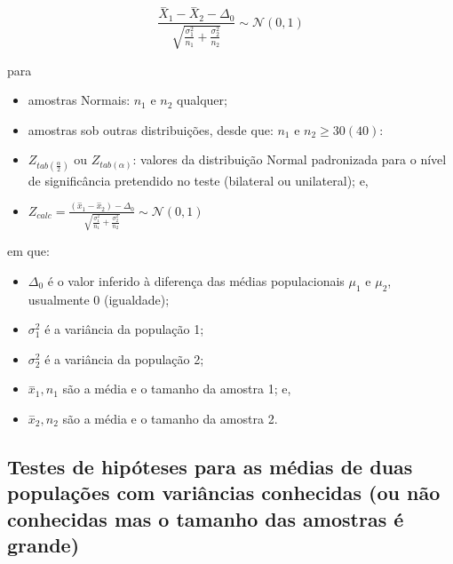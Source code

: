 \documentclass[
]{book}
\providecommand{\tightlist}{%
  \setlength{\itemsep}{0pt}\setlength{\parskip}{0pt}}
\begin{document}
\[
\frac{\stackrel{-}{X}_{1}-\stackrel{-}{X}_{2} - \Delta_{0}}{\sqrt{\frac{\sigma^{2}_{1}}{n_{1}} +  \frac{\sigma^{2}_{2}}{n_{2}}}} \sim \mathcal{N} (0,1)
\]

\hfill\break

para

\hfill\break

\begin{itemize}
\tightlist
\item
  amostras Normais: \(n_{1}\) e \(n_{2}\) qualquer;\\
\item
  amostras sob outras distribuições, desde que: \(n_{1}\) e \(n_{2} \ge 30(40)\):\\
\item
  \({Z}_{tab\left(\frac{\alpha }{2}\right)}\) ou \({Z}_{tab\left(\alpha \right)}\): valores da distribuição Normal padronizada para o nível de significância pretendido no teste (bilateral ou unilateral); e,\\
\item
  \(Z_{calc} = \frac{(\stackrel{-}{x}_{1} - \stackrel{-}{x}_{2})-\Delta_{0}}{\sqrt{\frac{\sigma^{2}_{1}}{n_{1}}+\frac{\sigma^{2}_{2}}{n_{2}}}} \sim \mathcal{N}(0,1)\)
\end{itemize}

\hfill\break

em que:

\hfill\break

\begin{itemize}
\tightlist
\item
  \(\Delta_{0}\) é o valor inferido à diferença das médias populacionais \(\mu_{1}\) e \(\mu_{2}\), usualmente 0 (igualdade);\\
\item
  \(\sigma_{1}^{2}\) é a variância da população 1;\\
\item
  \(\sigma_{2}^{2}\) é a variância da população 2;\\
\item
  \(\stackrel{-}{x}_{1}, n_{1}\) são a média e o tamanho da amostra 1; e,\\
\item
  \(\stackrel{-}{x}_{2}, n_{2}\) são a média e o tamanho da amostra 2.
\end{itemize}

\hfill\break

\hypertarget{testes-de-hipuxf3teses-para-as-muxe9dias-de-duas-populauxe7uxf5es-com-variuxe2ncias-conhecidas-ou-nuxe3o-conhecidas-mas-o-tamanho-das-amostras-uxe9-grande}{%
\subsection{Testes de hipóteses para as médias de duas populações com variâncias conhecidas (ou não conhecidas mas o tamanho das amostras é grande)}\label{testes-de-hipuxf3teses-para-as-muxe9dias-de-duas-populauxe7uxf5es-com-variuxe2ncias-conhecidas-ou-nuxe3o-conhecidas-mas-o-tamanho-das-amostras-uxe9-grande}}
\end{document}

